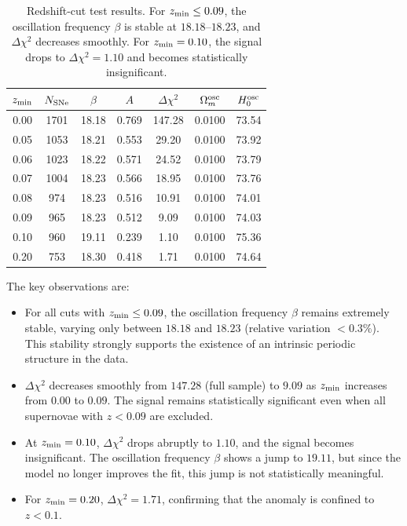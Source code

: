 \documentclass[10pt,a4paper,twocolumn]{article}
\begin{document}
\begin{table}[ht]
\centering
\setlength{\tabcolsep}{2.4pt} %
\caption{Redshift-cut test results. For $z_{\rm min}\le0.09$, the oscillation frequency $\beta$ is stable at $18.18$–$18.23$, and $\Delta\chi^2$ decreases smoothly. For $z_{\rm min}=0.10$, the signal drops to $\Delta\chi^2=1.10$ and becomes statistically insignificant.}
\label{tab:cut}
\begin{tabular}{ccccccc}
\toprule
$z_{\rm min}$ & $N_{\rm SNe}$ & $\beta$ & $A$ & $\Delta\chi^2$ & $\Omega_m^{\rm osc}$ & $H_0^{\rm osc}$ \\
\midrule
0.00 & 1701 & 18.18 & 0.769 & 147.28 & 0.0100 & 73.54 \\
0.05 & 1053 & 18.21 & 0.553 & 29.20 & 0.0100 & 73.92 \\
0.06 & 1023 & 18.22 & 0.571 & 24.52 & 0.0100 & 73.79 \\
0.07 & 1004 & 18.23 & 0.566 & 18.95 & 0.0100 & 73.76 \\
0.08 & 974  & 18.23 & 0.516 & 10.91 & 0.0100 & 74.01 \\
0.09 & 965  & 18.23 & 0.512 &  9.09 & 0.0100 & 74.03 \\
0.10 & 960  & 19.11 & 0.239 &  1.10 & 0.0100 & 75.36 \\
0.20 & 753  & 18.30 & 0.418 &  1.71 & 0.0100 & 74.64 \\
\bottomrule
\end{tabular}
\end{table}

The key observations are:
\begin{itemize}
    \item For all cuts with $z_{\rm min}\le0.09$, the oscillation frequency $\beta$ remains extremely stable, varying only between $18.18$ and $18.23$ (relative variation $<0.3\%$). This stability strongly supports the existence of an intrinsic periodic structure in the data.
    \item $\Delta\chi^2$ decreases smoothly from $147.28$ (full sample) to $9.09$ as $z_{\rm min}$ increases from $0.00$ to $0.09$. The signal remains statistically significant even when all supernovae with $z<0.09$ are excluded.
    \item At $z_{\rm min}=0.10$, $\Delta\chi^2$ drops abruptly to $1.10$, and the signal becomes insignificant. The oscillation frequency $\beta$ shows a jump to $19.11$, but since the model no longer improves the fit, this jump is not statistically meaningful.
    \item For $z_{\rm min}=0.20$, $\Delta\chi^2=1.71$, confirming that the anomaly is confined to $z<0.1$.
\end{itemize}
\end{document}
